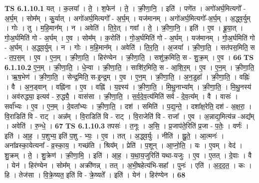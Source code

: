 \documentclass[17pt]{extarticle}
\begin{document}
                                \textbf{ TS 6.1.10.1} \newline
                  यत् । क॒लया᳚ । ते॒ । श॒फेन॑ । ते॒ । क्री॒णा॒नि॒ । इति॑ । पणे॑त । अगो॑अर्घ॒मित्यगो᳚ - अ॒र्घ॒म् । सोम᳚म् । कु॒र्यात् । अगो॑अर्घ॒मित्यगो᳚ - अ॒र्घ॒म् । यज॑मानम् । अगो॑अर्घ॒मित्यगो᳚-अ॒र्घ॒म् । अ॒द्ध्व॒र्युम् । गोः । तु । म॒हि॒मान᳚म् । न । अवेति॑ । ति॒रे॒त् । गवा᳚ । ते॒ । क्री॒णा॒नि॒ । इति॑ । ए॒व । ब्रू॒या॒त् । गो॒अ॒र्घमिति॑ गो - अ॒र्घम् । ए॒व । सोम᳚म् । क॒रोति॑ । गो॒अ॒र्घमिति॑ गो - अ॒र्घम् । यज॑मानम् । गो॒अ॒र्घमिति॑ गो - अ॒र्घम् । अ॒द्ध्व॒र्युम् । न । गोः । म॒हि॒मान᳚म् । अवेति॑ । ति॒र॒ति॒ । अ॒जया᳚ । क्री॒णा॒ति॒ । सत॑पस॒मिति॒ स - त॒प॒स॒म् । ए॒व । ए॒न॒म् । क्री॒णा॒ति॒ । हिर॑ण्येन । क्री॒णा॒ति॒ । सशु॑क्र॒मिति॒ स - शु॒क्र॒म् । ए॒व । \textbf{  66} \newline
                  \newline
                                \textbf{ TS 6.1.10.2} \newline
                  ए॒न॒म् । क्री॒णा॒ति॒ । धे॒न्वा । क्री॒णा॒ति॒ । साशि॑र॒मिति॒ स - आ॒शि॒र॒म् । ए॒व । ए॒न॒म् । क्री॒णा॒ति॒ । ऋ॒ष॒भेण॑ । क्री॒णा॒ति॒ । सेन्द्र॒मिति॒ स-इ॒न्द्र॒म् । ए॒व । ए॒न॒म् । क्री॒णा॒ति॒ । अ॒न॒डुहा᳚ । क्री॒णा॒ति॒ । वह्निः॑ । वै । अ॒न॒ड्वान् । वह्नि॑ना । ए॒व । वह्नि॑ । य॒ज्ञ्स्य॑ । क्री॒णा॒ति॒ । मि॒थु॒नाभ्या᳚म् । क्री॒णा॒ति॒ । मि॒थु॒नस्य॑ । अव॑रुद्ध्या॒ इत्यव॑ - रु॒द्ध्यै॒ । वास॑सा । क्री॒णा॒ति॒ । स॒र्व॒दे॒व॒त्य॑मिति॑ सर्व - दे॒व॒त्य᳚म् । वै । वासः॑ । सर्वा᳚भ्यः । ए॒व । ए॒न॒म् । दे॒वता᳚भ्यः । क्री॒णा॒ति॒ । दश॑ । समिति॑ । प॒द्य॒न्ते॒ । दशा᳚क्ष॒रेति॒ दश॑ - अ॒क्ष॒रा॒ । वि॒राडिति॑ वि - राट् । अन्न᳚म् । वि॒राडिति॑ वि - राट् । वि॒राजेति॑ वि - राजा᳚ । ए॒व । अ॒न्नाद्य॒मित्य॑न्न -अद्य᳚म् । अवेति॑ । रु॒न्धे॒ । \textbf{  67} \newline
                  \newline
                                \textbf{ TS 6.1.10.3} \newline
                  तपसः॑ । त॒नूः । अ॒सि॒ । प्र॒जाप॑ते॒रिति॑ प्र॒जा - प॒तेः॒ । वर्णः॑ । इति॑ । आ॒ह॒ । प॒शुभ्य॒ इति॑ प॒शु - भ्यः॒ । ए॒व । तत् । अ॒द्ध्व॒र्युः । नीति॑ । ह्नु॒ते॒ । आ॒त्मनः॑ । अना᳚व्रस्का॒येत्यना᳚ - व्र॒स्का॒य॒ । गच्छ॑ति । श्रिय᳚म् । प्रेति॑ । प॒शून् । आ॒प्नो॒ति॒ । यः । ए॒वम् । वेद॑ । शु॒क्रम् । ते॒ । शु॒क्रेण॑ । क्री॒णा॒मि॒ । इति॑ । आ॒ह॒ । य॒था॒य॒जुरिति॑ यथा-यजुः । ए॒व । ए॒तत् । दे॒वाः । वै । येन॑ । हिर॑ण्येन । सोम᳚म् । अक्री॑णन्न् । तत् । अ॒भी॒षहेत्य॑भि-सहा᳚ । पुनः॑ । एति॑ । अ॒द॒द॒त॒ । कः । हि । तेज॑सा । वि॒क्रे॒ष्यत॒ इति॑ वि - क्रे॒ष्यते᳚ । इति॑ । येन॑ । हिर॑ण्येन । \textbf{  68} \newline
                  \newline
\end{document}
